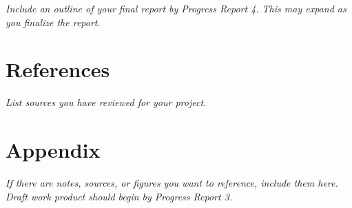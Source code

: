 \documentclass[12pt]{article}
\newcommand{\instruction}[1]{{\small\itshape #1}}
\begin{document}
\instruction{Include an outline of your final report by Progress Report 4. This may expand as you finalize the report.}

\section*{References}

\instruction{List sources you have reviewed for your project.}

\newpage
\section*{Appendix}

\instruction{If there are notes, sources, or figures you want to reference, include them here. Draft work product should begin by Progress Report 3.}
\end{document}
